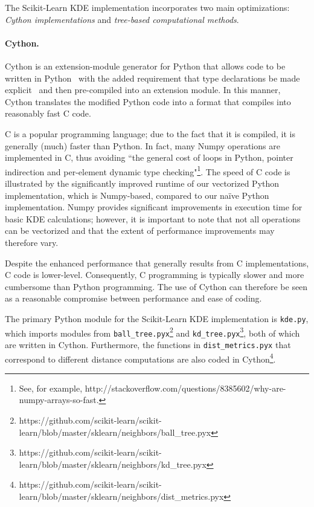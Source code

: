 \documentclass[11pt]{article}
\begin{document}
\noindent The Scikit-Learn KDE implementation incorporates two main optimizations: \textit{Cython implementations} and \textit{tree-based computational methods}.

\paragraph{Cython.} Cython is an extension-module generator for Python that allows code to be written in Python \textendash \ with the added requirement that type declarations be made explicit \textendash \ and then pre-compiled into an extension module. In this manner, Cython translates the modified Python code into a format that compiles into reasonably fast C code. \medskip

\noindent C is a popular programming language; due to the fact that it is compiled, it is generally (much) faster than Python. In fact, many Numpy operations are implemented in C, thus avoiding ``the general cost of loops in Python, pointer indirection and per-element dynamic type checking"\footnote{See, for example, http://stackoverflow.com/questions/8385602/why-are-numpy-arrays-so-fast.}. The speed of C code is illustrated by the significantly improved runtime of our vectorized Python implementation, which is Numpy-based, compared to our na\"ive Python implementation. Numpy provides significant improvements in execution time for basic KDE calculations; however, it is important to note that not all operations can be vectorized and that the extent of performance improvements may therefore vary. \medskip

\noindent Despite the enhanced performance that generally results from C implementations, C code is lower-level. Consequently, C programming is typically slower and more cumbersome than Python programming. The use of Cython can therefore be seen as a reasonable compromise between performance and ease of coding. \medskip

\noindent The primary Python module for the Scikit-Learn KDE implementation is \texttt{kde.py}, which imports modules from \texttt{ball\_tree.pyx}\footnote{https://github.com/scikit-learn/scikit-learn/blob/master/sklearn/neighbors/ball\_tree.pyx} and \texttt{kd\_tree.pyx}\footnote{https://github.com/scikit-learn/scikit-learn/blob/master/sklearn/neighbors/kd\_tree.pyx}, both of which are written in Cython. Furthermore, the functions in \texttt{dist\_metrics.pyx} that correspond to different distance computations are also coded in Cython\footnote{https://github.com/scikit-learn/scikit-learn/blob/master/sklearn/neighbors/dist\_metrics.pyx}. \medskip
\end{document}
